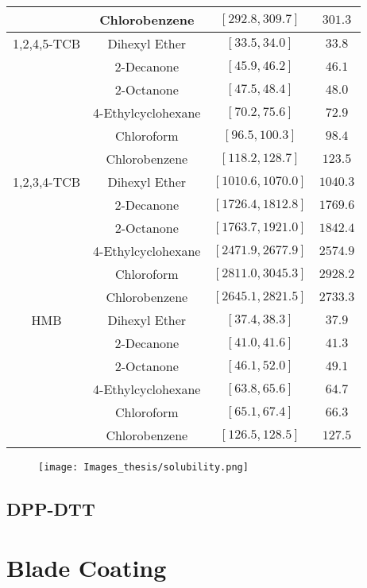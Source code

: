 \documentclass  [
  paper    = a4,
  BCOR     = 10mm,
  twoside,
  fontsize = 12pt,
  fleqn,
  toc      = bibnumbered,
  toc      = listofnumbered,
  numbers  = noendperiod,
  headings = normal,
  listof   = leveldown,
  version  = 3.03
]                                       {scrreprt}
\begin{document}
\begin{table*}[!h]
\begin{tabular}{cccc}
				& Chlorobenzene & $[292.8, 309.7]$ & $301.3$\\
		\midrule
		1,2,4,5-TCB & Dihexyl Ether & $[33.5, 34.0]$ & $33.8$\\
				& 2-Decanone & $[45.9, 46.2]$ & $46.1$\\
				& 2-Octanone & $[47.5, 48.4]$ & $48.0$\\
				& 4-Ethylcyclohexane & $[70.2, 75.6]$ & $72.9$\\
				& Chloroform & $[96.5, 100.3]$ & $98.4$\\
				& Chlorobenzene & $[118.2, 128.7]$ & $123.5$\\
		\midrule
		1,2,3,4-TCB & Dihexyl Ether & $[1010.6, 1070.0]$ & $1040.3$\\
				& 2-Decanone & $[1726.4, 1812.8]$ & $1769.6$\\
				& 2-Octanone & $[1763.7, 1921.0]$ & $1842.4$\\
				& 4-Ethylcyclohexane & $[2471.9, 2677.9]$ & $2574.9$\\
				& Chloroform & $[2811.0, 3045.3]$ & $2928.2$\\
				& Chlorobenzene & $[2645.1, 2821.5]$ & $2733.3$\\
		\midrule
		HMB & Dihexyl Ether & $[37.4, 38.3]$ & $37.9$\\
				& 2-Decanone & $[41.0, 41.6]$ & $41.3$\\
				& 2-Octanone & $[46.1, 52.0]$ & $49.1$\\
				& 4-Ethylcyclohexane & $[63.8, 65.6]$ & $64.7$\\
				& Chloroform & $[65.1, 67.4]$ & $66.3$\\
				& Chlorobenzene & $[126.5, 128.5]$ & $127.5$\\
		\hline
	\end{tabular}
\end{table*}

\begin{figure}[!h]
	\texttt{[image: Images\_thesis/solubility.png]}
	\label{fig:solubility}
\end{figure}

		\subsection{DPP-DTT}
		
	\section{Blade Coating}\label{sec:coating}
	
\end{document}
